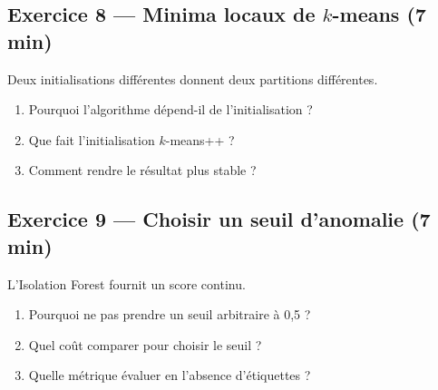 \subsection*{Exercice 8 --- Minima locaux de $k$-means \hfill \normalfont\footnotesize (7 min)}
Deux initialisations différentes donnent deux partitions différentes.
\begin{enumerate}
  \item Pourquoi l'algorithme dépend-il de l'initialisation ?
  \item Que fait l'initialisation $k$-means++ ?
  \item Comment rendre le résultat plus stable ?
\end{enumerate}

\subsection*{Exercice 9 --- Choisir un seuil d'anomalie \hfill \normalfont\footnotesize (7 min)}
L'Isolation Forest fournit un score continu.
\begin{enumerate}
  \item Pourquoi ne pas prendre un seuil arbitraire à 0,5 ?
  \item Quel coût comparer pour choisir le seuil ?
  \item Quelle métrique évaluer en l'absence d'étiquettes ?
\end{enumerate}

\newpage
